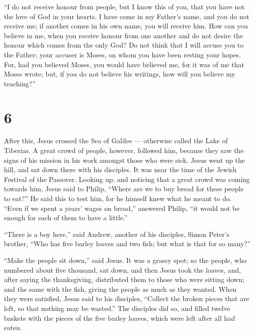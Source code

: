  ``I do not receive honour from people,  but I
know this of you, that you have not the love of God in your hearts.
 I have come in my Father's name, and you do not receive
me; if another comes in his own name, you will receive him.
 How can you believe in me, when you receive honour from
one another and do not desire the honour which comes from the only God?
 Do not think that I will accuse you to the Father; your
accuser is Moses, on whom you have been resting your hopes.
 For, had you believed Moses, you would have believed me,
for it was of me that Moses wrote;  but, if you do not
believe his writings, how will you believe my teaching?''

\hypertarget{section-5}{%
\section{6}\label{section-5}}

 After this, Jesus crossed the Sea of Galilee --- otherwise
called the Lake of Tiberias.  A great crowd of people,
however, followed him, because they saw the signs of his mission in his
work amongst those who were sick.  Jesus went up the hill,
and sat down there with his disciples.  It was near the time
of the Jewish Festival of the Passover.  Looking up, and
noticing that a great crowd was coming towards him, Jesus said to
Philip, ``Where are we to buy bread for these people to eat?''
 He said this to test him, for he himself knew what he meant
to do.  ``Even if we spent a years' wages on bread,''
answered Philip, ``it would not be enough for each of them to have a
little.''

 ``There is a boy here,'' said Andrew, another of his
disciples, Simon Peter's brother,  ``Who has five barley
loaves and two fish; but what is that for so many?''

 ``Make the people sit down,'' said Jesus. It was a grassy
spot; so the people, who numbered about five thousand, sat down,
 and then Jesus took the loaves, and, after saying the
thanksgiving, distributed them to those who were sitting down; and the
same with the fish, giving the people as much as they wanted.
 When they were satisfied, Jesus said to his disciples,
``Collect the broken pieces that are left, so that nothing may be
wasted.''  The disciples did so, and filled twelve baskets
with the pieces of the five barley loaves, which were left after all had
eaten.

